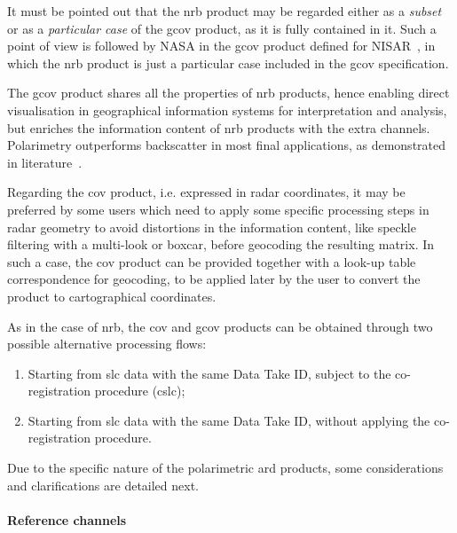 It must be pointed out that the \acs{nrb} product may be regarded either as a \textit{subset} or as a \textit{particular case} of the \acs{gcov} product, as it is fully contained in it. Such a point of view is followed by NASA in the \acs{gcov} product defined for NISAR~\cite{NISAR_GCOV_ProdSpec}, in which the \acs{nrb} product is just a particular case included in the \acs{gcov} specification.

The \acs{gcov} product shares all the properties of \acs{nrb} products, hence  enabling direct visualisation in geographical information systems for interpretation and analysis, but enriches the information content of \acs{nrb} products with the extra channels. Polarimetry outperforms backscatter in most final applications, as demonstrated in literature~\cite{Hajnsek2021}. 

Regarding the \acs{cov} product, i.e. expressed in radar coordinates, it may be preferred by some users which need to apply some specific processing steps in radar geometry to avoid distortions in the information content, like speckle filtering with a multi-look or boxcar, before geocoding the resulting matrix. In such a case, the \acs{cov} product can be provided together with a look-up table correspondence for geocoding, to be applied later by the user to convert the product to cartographical coordinates. 

As in the case of \acs{nrb}, the \acs{cov} and \acs{gcov} products can be obtained through two possible alternative processing flows:
\begin{enumerate}
    \item Starting from \acs{slc} data with the same Data Take ID, subject to the co-registration procedure (\acs{cslc});
    \item Starting from \acs{slc} data with the same Data Take ID, without applying the co-registration procedure.
\end{enumerate}

Due to the specific nature of the polarimetric \acs{ard} products, some considerations and clarifications are detailed next. 

\paragraph*{Reference channels}


